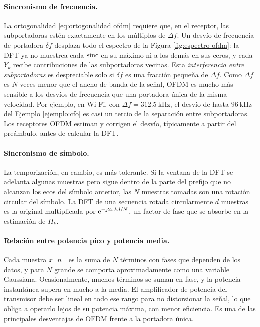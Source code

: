 \paragraph{Sincronismo de frecuencia.} La ortogonalidad \eqref{eq:ortogonalidad ofdm} requiere que, en el receptor, las subportadoras estén exactamente en los múltiplos de $\Delta f$. Un desvío de frecuencia de portadora $\delta f$ desplaza todo el espectro de la Figura \ref{fig:espectro ofdm}: la DFT ya no muestrea cada $\operatorname{sinc}$ en su máximo ni a los demás en sus ceros, y cada $Y_k$ recibe contribuciones de las subportadoras vecinas. Esta \emph{interferencia entre subportadoras} es despreciable solo si $\delta f$ es una fracción pequeña de $\Delta f$. Como $\Delta f$ es $N$ veces menor que el ancho de banda de la señal, OFDM es mucho más sensible a los desvíos de frecuencia que una portadora única de la misma velocidad. Por ejemplo, en Wi-Fi, con $\Delta f=312.5\ \unit{\kilo\hertz}$, el desvío de hasta $96\ \unit{\kilo\hertz}$ del Ejemplo \ref{ejemplo:cfo} es casi un tercio de la separación entre subportadoras. Los receptores OFDM estiman y corrigen el desvío, típicamente a partir del preámbulo, antes de calcular la DFT.

\paragraph{Sincronismo de símbolo.} La temporización, en cambio, es más tolerante. Si la ventana de la DFT se adelanta algunas muestras pero sigue dentro de la parte del prefijo que no alcanzan los ecos del símbolo anterior, las $N$ muestras tomadas son una rotación circular del símbolo. La DFT de una secuencia rotada circularmente $d$ muestras es la original multiplicada por $\mathrm{e}^{-j2\pi kd/N}$, un factor de fase que se absorbe en la estimación de $H_k$.

\paragraph{Relación entre potencia pico y potencia media.} Cada muestra $x[n]$ es la suma de $N$ términos con fases que dependen de los datos, y para $N$ grande se comporta aproximadamente como una variable Gaussiana. Ocasionalmente, muchos términos se suman en fase, y la potencia instantánea supera en mucho a la media. El amplificador de potencia del transmisor debe ser lineal en todo ese rango para no distorsionar la señal, lo que obliga a operarlo lejos de su potencia máxima, con menor eficiencia. Es una de las principales desventajas de OFDM frente a la portadora única.

